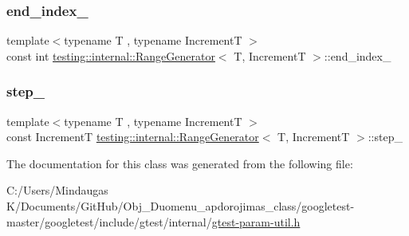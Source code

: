 \subsubsection{\texorpdfstring{end\_index\_}{end\_index\_}}
{\footnotesize\ttfamily template$<$typename T , typename IncrementT $>$ \\
const int \mbox{\hyperlink{classtesting_1_1internal_1_1_range_generator}{testing\+::internal\+::\+Range\+Generator}}$<$ T, IncrementT $>$\+::end\+\_\+index\+\_\+\hspace{0.3cm}{\ttfamily [private]}}

\mbox{\label{classtesting_1_1internal_1_1_range_generator_ae7f3c4b76d8610f030fdd12285ebd8fb}} 
\subsubsection{\texorpdfstring{step\_}{step\_}}
{\footnotesize\ttfamily template$<$typename T , typename IncrementT $>$ \\
const IncrementT \mbox{\hyperlink{classtesting_1_1internal_1_1_range_generator}{testing\+::internal\+::\+Range\+Generator}}$<$ T, IncrementT $>$\+::step\+\_\+\hspace{0.3cm}{\ttfamily [private]}}



The documentation for this class was generated from the following file\+:\begin{DoxyCompactItemize}
\item 
C\+:/\+Users/\+Mindaugas K/\+Documents/\+Git\+Hub/\+Obj\+\_\+\+Duomenu\+\_\+apdorojimas\+\_\+class/googletest-\/master/googletest/include/gtest/internal/\mbox{\hyperlink{googletest-master_2googletest_2include_2gtest_2internal_2gtest-param-util_8h}{gtest-\/param-\/util.\+h}}\end{DoxyCompactItemize}
